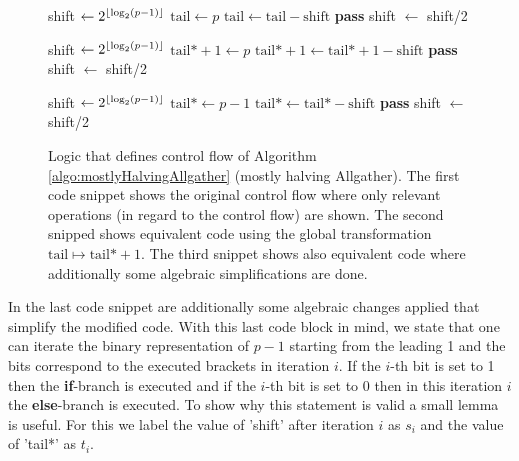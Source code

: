 \begin{figure}[htb]
	\centering
	\begin{minipage}{0.29\textwidth}
	\begin{algorithmic}[1]
  		\algrenewcommand{\algorithmicindent}{1em} 
		\State shift $\gets 2^{\lfloor\log_2(p-1)\rfloor}$
		\State  $\text{tail}\gets p$
		\State $\text{tail}\gets \text{tail} - \text{shift}$
		\Else
		\State \textbf{pass}
		\EndIf
		\State shift $\gets$ shift/2
		\EndWhile	
	\end{algorithmic}
	\end{minipage}
	\hfill
	\begin{minipage}{0.39\textwidth}
	\begin{algorithmic}[1]
		\algrenewcommand{\algorithmicindent}{1em} 
		\State shift $\gets 2^{\lfloor\log_2(p-1)\rfloor}$
		\State  $\text{tail*} + 1\gets p$
		\State $\text{tail*}+1\gets \text{tail*}+1 - \text{shift}$
		\Else
		\State \textbf{pass}
		\EndIf
		\State shift $\gets$ shift/2
		\EndWhile	
	\end{algorithmic}
	\end{minipage}
	\hfill
	\begin{minipage}{0.3\textwidth}
	\begin{algorithmic}[1]
		\algrenewcommand{\algorithmicindent}{1em} 
		\State shift $\gets 2^{\lfloor\log_2(p-1)\rfloor}$
		\State  $\text{tail*} \gets p-1$
		\State $\text{tail*}\gets \text{tail*} - \text{shift}$
		\Else
		\State \textbf{pass}
		\EndIf
		\State shift $\gets$ shift/2
		\EndWhile	
	\end{algorithmic}
	\end{minipage}
	\caption{Logic that defines control flow of Algorithm \ref{algo:mostlyHalvingAllgather} (mostly halving Allgather). The first code snippet shows the original control flow where only relevant operations (in regard to the control flow) are shown. The second snipped shows equivalent code using the global transformation $\text{tail} \mapsto \text{tail*} + 1$. The third snippet shows also equivalent code where additionally some algebraic simplifications are done.}
	\label{fig:mostlyHalvingControlFlow}
\end{figure}
In the last code snippet are additionally some algebraic changes applied that simplify the modified code. With this last code block in mind, we state that one can iterate the binary representation of $p-1$ starting from the leading 1 and the bits correspond to the executed brackets in iteration $i$. If the $i$-th bit is set to 1 then the \textbf{if}-branch is executed and if the $i$-th bit is set to 0 then in this iteration $i$ the \textbf{else}-branch is executed. To show why this statement is valid a small lemma is useful. For this we label the value of 'shift' after iteration $i$ as $s_i$ and the value of 'tail*' as $t_i$.
